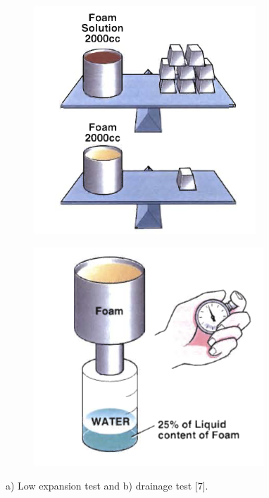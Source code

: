 \documentclass[12pt]{report}
\begin{document}
\begin{figure}[H]
    \begin{subfigure}{.5\textwidth}
        \includegraphics[width=\textwidth]{low_expansion_test.png}
        \caption{}
    \end{subfigure}
    \begin{subfigure}{.5\textwidth}
        \centering
        \includegraphics[width=\textwidth]{drainage_test.png}
        \caption{}
    \end{subfigure}
    
    \centering
    \caption{a) Low expansion test and b) drainage test [7].}
    \label{ch2:figure:tests}
\end{figure}
\end{document}
